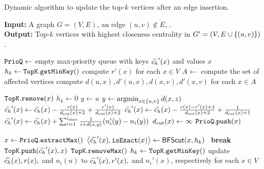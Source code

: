 \begin{algorithm}[t!]
\footnotesize
\caption{\footnotesize Dynamic \nbcut algorithm to update the
top-$k$ vertices after an edge insertion.}
\label{algo:nbcut-dyn-ins}
\textbf{Input:} A graph $G = (V, E)$, an edge $(u,v) \notin E$, \topk.\\
\textbf{Output:} Top-$k$ vertices with highest closeness centrality in $G' = (V, E \cup \set{(u, v)})$.

\begin{algorithmic}[1]
\State$\texttt{PrioQ} \gets$ empty max-priority queue with keys $\widetilde{c_h}'(x)$ and values $x$
\State$h_k \gets \texttt{TopK}.\texttt{getMinKey}()$
\State compute $r'(x)$ for each $x \in V$\label{line:nbcut-dyn-ins-init1}
\State$A \gets $ compute the set of affected vertices\label{line:nbcut-dyn-ins-aff}
\State compute $d(u, x), d'(u, x), d(x, v), d'(x, v)$ for each $x\in A$
\label{line:nbcut-dyn-ins-init2}\smallskip

\label{line:nbcut-dyn-ins-remove1}
\State$\texttt{TopK}.\texttt{remove}(x)$\label{line:nbcut-dyn-ins-remove2}
\State$h_k \gets 0$
\EndIf
\State$y \gets u$
\State$y \gets \argmin_{z \in \set{u, v}}d(x, z)$
\EndIf
{}\label{line:nbcut-dyn-ins-upd1}
\State$\widetilde{c_h}'(x) \gets \widetilde{c_h}(x) - \frac{r(x)}{d_{\text{cut}}(x) + 2} + \frac{r'(x)}{d_{\text{cut}}(x) + 2}$
\label{line:nbcut-dyn-ins-far-away}
\State$\widetilde{c_h}'(x) \gets \widetilde{c_h}(x) - \frac{r(x) - r'(x) + 1}{d_{\text{cut}}(x) + 2}
+ \frac{1}{d_{\text{cut}}(x) + 1}$
\label{line:nbcut-dyn-ins-boundary}
\Else
\State$\harmupp'(x) \gets \harmupp(x) +
\sum_{i = 1}^{\imax}\frac{1}{i + d(x, y)} \roundb{n_i'(y) - n_i(y)}$
\label{line:nbcut-dyn-ins-dist-bound}
\State$d_{\text{cut}}(x) \gets \infty$
\label{line:nbcut-dyn-ins-dist-dcut-infty}
\EndIf
\State$\texttt{PrioQ}.\texttt{push}(x)$\label{line:nbcut-dyn-ins-upd2}
\EndFor\smallskip

\label{line:nbcut-dyn-ins-resume1}
\State$x \gets \texttt{PrioQ}.\texttt{extractMax}()$
\State$\left<\harmupp'(x), \isexact(x) \right> \gets \bfscut(x, h_k)$
\Else\ \textbf{break}\label{line:nbcut-dyn-ins-break}
\EndIf
{}
\State$\texttt{TopK}.\texttt{push}(\widetilde{c_h}'(x), x)$
\EndIf
{}
\State$\texttt{TopK}.\texttt{removeMax}()$
\EndIf
{}
\State$h_k \gets \texttt{TopK}.\texttt{getMinKey}()$
\EndIf
\EndWhile\label{line:nbcut-dyn-ins-resume2}
\State update $\widetilde{c_h}(x), r(x),$ and $n_i(u)$ to $\widetilde{c_h}'(x), r'(x),$ and $n_i'(x)$, respectively
for each $x\in V$
\State\Return\topk
\end{algorithmic}
\end{algorithm}
